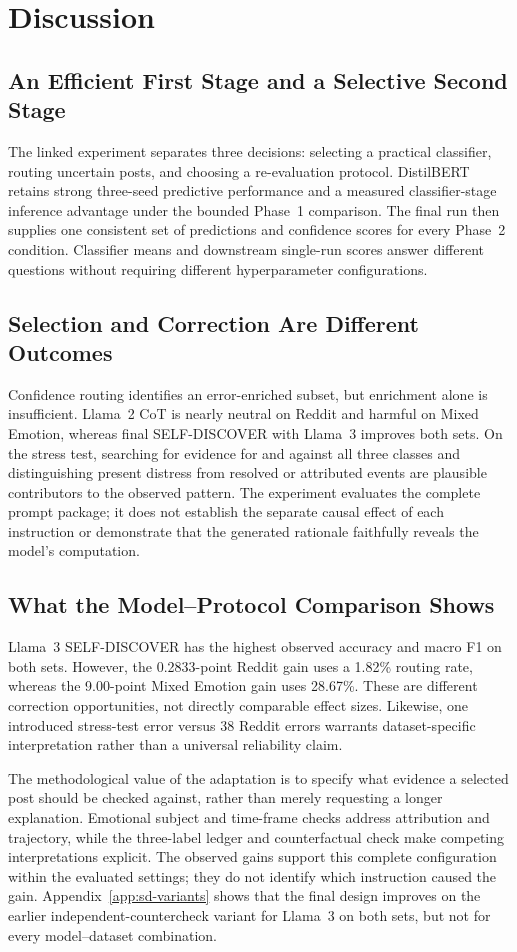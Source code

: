 \documentclass{ieeeaccess}
\begin{document}
\section{Discussion}
\subsection{An Efficient First Stage and a Selective Second Stage}
The linked experiment separates three decisions: selecting a practical classifier, routing uncertain posts, and choosing a re-evaluation protocol. DistilBERT retains strong three-seed predictive performance and a measured classifier-stage inference advantage under the bounded Phase~1 comparison. The final run then supplies one consistent set of predictions and confidence scores for every Phase~2 condition. Classifier means and downstream single-run scores answer different questions without requiring different hyperparameter configurations.

\subsection{Selection and Correction Are Different Outcomes}
Confidence routing identifies an error-enriched subset, but enrichment alone is insufficient. Llama~2 CoT is nearly neutral on Reddit and harmful on Mixed Emotion, whereas final SELF-DISCOVER with Llama~3 improves both sets. On the stress test, searching for evidence for and against all three classes and distinguishing present distress from resolved or attributed events are plausible contributors to the observed pattern. The experiment evaluates the complete prompt package; it does not establish the separate causal effect of each instruction or demonstrate that the generated rationale faithfully reveals the model's computation.

\subsection{What the Model--Protocol Comparison Shows}
Llama~3 SELF-DISCOVER has the highest observed accuracy and macro F1 on both sets. However, the 0.2833-point Reddit gain uses a 1.82\% routing rate, whereas the 9.00-point Mixed Emotion gain uses 28.67\%. These are different correction opportunities, not directly comparable effect sizes. Likewise, one introduced stress-test error versus 38 Reddit errors warrants dataset-specific interpretation rather than a universal reliability claim.

The methodological value of the adaptation is to specify what evidence a selected post should be checked against, rather than merely requesting a longer explanation. Emotional subject and time-frame checks address attribution and trajectory, while the three-label ledger and counterfactual check make competing interpretations explicit. The observed gains support this complete configuration within the evaluated settings; they do not identify which instruction caused the gain. Appendix~\ref{app:sd-variants} shows that the final design improves on the earlier independent-countercheck variant for Llama~3 on both sets, but not for every model--dataset combination.
\end{document}
